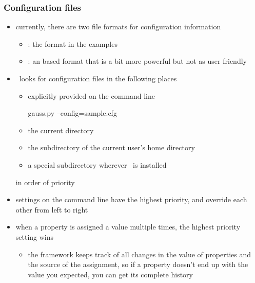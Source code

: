 \begin{frame}[fragile]
%
  \frametitle{Configuration files}
%
  \begin{itemize}
%
  \item currently, there are two file formats for configuration information
    \begin{itemize}
    \item {}: the format in the examples
    \item {}: an  based format that is a bit more powerful but not as
      user friendly
    \end{itemize}
%
  \item \pyre\ looks for configuration files in the following places
    \begin{itemize}
    \item explicitly provided on the command line
      \begin{ish}{}
 gauss.py --config=sample.cfg
      \end{ish}
    \item the current directory
    \item the  subdirectory of the current user's home directory
    \item a special subdirectory wherever \pyre\ is installed
    \end{itemize}
    in order of priority
%
  \item settings on the command line have the highest priority, and override each other from
    left to right
%
  \item when a property is assigned a value multiple times, the highest priority setting wins
    \begin{itemize}
    \item the framework keeps track of all changes in the value of properties and the source of
      the assignment, so if a property doesn't end up with the value you expected, you can get
      its complete history
    \end{itemize}
%
  \end{itemize}
%
\end{frame}

